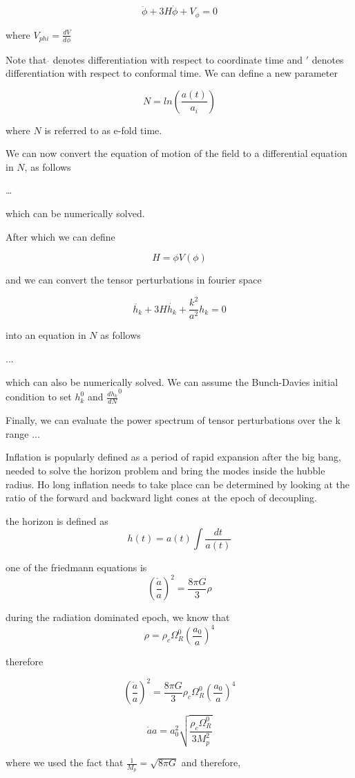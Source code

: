 \documentclass[12pt, a4paper]{report}
\begin{document}
$$\ddot{\phi} + 3H\dot{\phi} + V_{\phi} = 0$$

where $V_{phi} = \frac{dV}{d\phi}$

Note that $\dot{}$ denotes differentiation with respect to coordinate time and $'$ denotes differentiation with respect to conformal time. We can define a new parameter

$$N = ln(\frac{a(t)}{a_i})$$

where $N$ is referred to as e-fold time.

We can now convert the equation of motion of the field to a differential equation in $N$, as follows

\ldots

which can be numerically solved.

After which we can define

$$H = \phi V(\phi)$$

and we can convert the tensor perturbations in fourier space

$$\ddot{h_k} + 3H\dot{h_k} + \frac{k^2}{a^2}h_k = 0$$

into an equation in $N$ as follows 

...

which can also be numerically solved. We can assume the Bunch-Davies initial condition to set $h_k^0$ and $\frac{dh_k}{dN}^0$

Finally, we can evaluate the power spectrum of tensor perturbations over the k range ... 

\newpage

Inflation is popularly defined as a period of rapid expansion after the big bang, needed to solve the horizon problem and bring the modes inside the hubble radius. Ho long inflation needs to take place can be determined by looking at the ratio of the forward and backward light cones at the epoch of decoupling.

the horizon is defined as
$$h(t) = a(t)\int\frac{dt}{a(t)}$$

one of the friedmann equations is
$$(\frac{\dot{a}}{a})^2 = \frac{8\pi G}{3}\rho$$

during the radiation dominated epoch, we know that
$$\rho = \rho_c\Omega_R^0(\frac{a_0}{a})^4$$

therefore

$$(\frac{\dot{a}}{a})^2 = \frac{8\pi G}{3}\rho_c\Omega_R^0(\frac{a_0}{a})^4$$

$$\dot{a}{a} = a_0^2\sqrt{\frac{\rho_c\Omega_R^0}{3M_p^2}}$$

where we used the fact that $\frac{1}{M_p} = \sqrt{8\pi G}$ and therefore,
\end{document}
